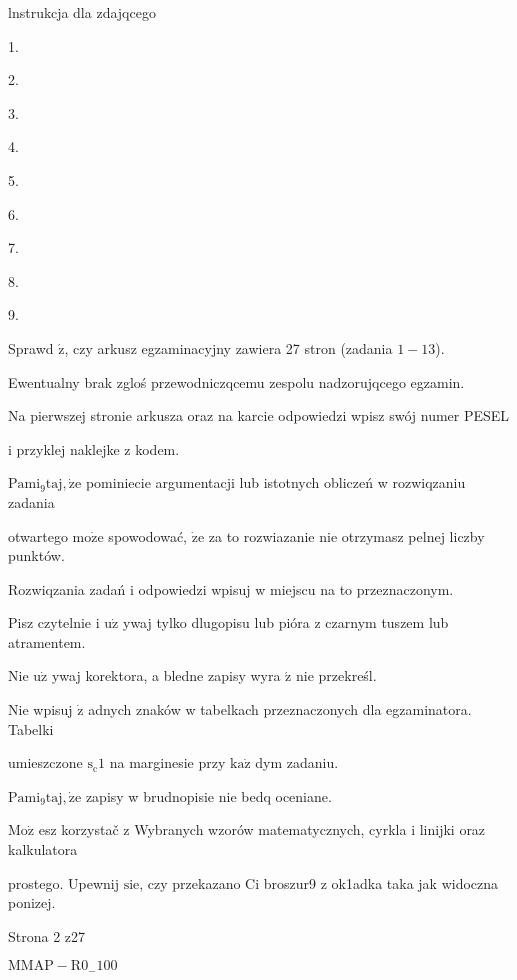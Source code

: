\documentclass[a4paper,12pt]{article}
\begin{document}
lnstrukcja dla zdajqcego

1.

2.

3.

4.

5.

6.

7.

8.

9.

Sprawd $\acute{\mathrm{z}}$, czy arkusz egzaminacyjny zawiera 27 stron (zadania $1-13$).

Ewentualny brak zgloś przewodniczqcemu zespolu nadzorujqcego egzamin.

Na pierwszej stronie arkusza oraz na karcie odpowiedzi wpisz swój numer PESEL

i przyklej naklejke z kodem.

$\mathrm{P}\mathrm{a}\mathrm{m}\mathrm{i}_{9}\mathrm{t}\mathrm{a}\mathrm{j}, \dot{\mathrm{z}}\mathrm{e}$ pominiecie argumentacji lub istotnych obliczeń w rozwiqzaniu zadania

otwartego $\mathrm{m}\mathrm{o}\dot{\mathrm{z}}\mathrm{e}$ spowodować, $\dot{\mathrm{z}}\mathrm{e}$ za to rozwiazanie nie otrzymasz pelnej liczby punktów.

Rozwiqzania zadań i odpowiedzi wpisuj w miejscu na to przeznaczonym.

Pisz czytelnie i $\mathrm{u}\dot{\mathrm{z}}$ ywaj tylko dlugopisu lub pióra z czarnym tuszem lub atramentem.

Nie $\mathrm{u}\dot{\mathrm{z}}$ ywaj korektora, a bledne zapisy wyra $\acute{\mathrm{z}}$ nie przekreśl.

Nie wpisuj $\dot{\mathrm{z}}$ adnych znaków w tabelkach przeznaczonych dla egzaminatora. Tabelki

umieszczone $\mathrm{s}_{\mathrm{c}}1$ na marginesie przy $\mathrm{k}\mathrm{a}\dot{\mathrm{z}}$ dym zadaniu.

$\mathrm{P}\mathrm{a}\mathrm{m}\mathrm{i}_{9}\mathrm{t}\mathrm{a}\mathrm{j}, \dot{\mathrm{z}}\mathrm{e}$ zapisy w brudnopisie nie bedq oceniane.

$\mathrm{M}\mathrm{o}\dot{\mathrm{z}}$ esz korzystač z Wybranych wzorów matematycznych, cyrkla i linijki oraz kalkulatora

prostego. Upewnij $\mathrm{s}\mathrm{i}\mathrm{e}$, czy przekazano Ci broszur9 z ok1adka taka jak widoczna ponizej.

Strona 2 z27

$\mathrm{M}\mathrm{M}\mathrm{A}\mathrm{P}-\mathrm{R}0_{-}100$
\end{document}
